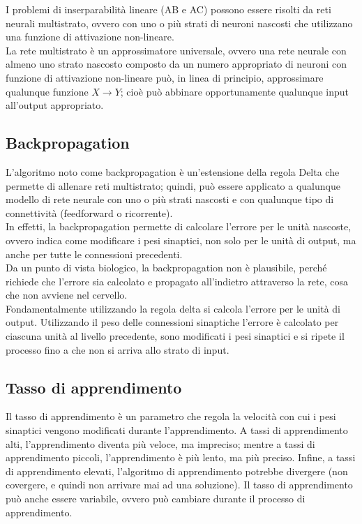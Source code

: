 I problemi di inserparabilità lineare (AB e AC) possono essere risolti da reti
neurali multistrato, ovvero con uno o più strati di neuroni nascosti che
utilizzano una funzione di attivazione non-lineare.\\
La rete multistrato è un approssimatore universale, ovvero una rete neurale con
almeno uno strato nascosto composto da un numero appropriato di neuroni con
funzione di attivazione non-lineare può, in linea di principio, approssimare
qualunque funzione $X \rightarrow Y$; cioè può abbinare opportunamente qualunque
input all'output appropriato.

\subsection{Backpropagation}

L'algoritmo noto come backpropagation è un'estensione della regola Delta che
permette di allenare reti multistrato; quindi, può essere applicato a qualunque
modello di rete neurale con uno o più strati nascosti e con qualunque tipo di
connettività (feedforward o ricorrente).\\
In effetti, la backpropagation permette di calcolare l'errore per le unità
nascoste, ovvero indica come modificare i pesi sinaptici, non solo per le unità
di output, ma anche per tutte le connessioni precedenti.\\
Da un punto di vista biologico, la backpropagation non è plausibile, perché
richiede che l'errore sia calcolato e propagato all'indietro attraverso la rete,
cosa che non avviene nel cervello.\\
Fondamentalmente utilizzando la regola delta si calcola l'errore per le unità di
output. Utilizzando il peso delle connessioni sinaptiche l'errore è calcolato
per ciascuna unità al livello precedente, sono modificati i pesi sinaptici e si
ripete il processo fino a che non si arriva allo strato di input.

\subsection{Tasso di apprendimento}

Il tasso di apprendimento è un parametro che regola la velocità con cui i pesi
sinaptici vengono modificati durante l'apprendimento. A tassi di apprendimento
alti, l'apprendimento diventa più veloce, ma impreciso; mentre a tassi di
apprendimento piccoli, l'apprendimento è più lento, ma più preciso. Infine, a
tassi di apprendimento elevati, l'algoritmo di apprendimento potrebbe divergere
(non covergere, e quindi non arrivare mai ad una soluzione). Il tasso di
apprendimento può anche essere variabile, ovvero può cambiare durante il
processo di apprendimento.

